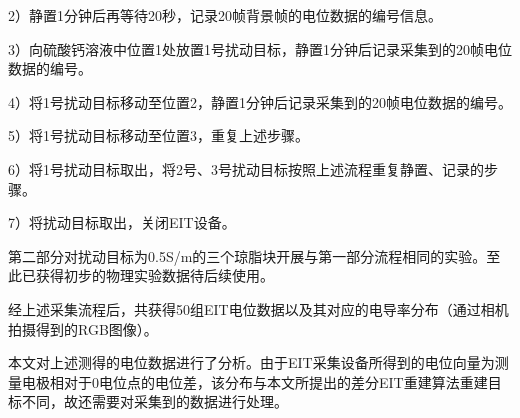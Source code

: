      2）静置1分钟后再等待20秒，记录20帧背景帧的电位数据的编号信息。

     3）向硫酸钙溶液中位置1处放置1号扰动目标，静置1分钟后记录采集到的20帧电位数据的编号。

     4）将1号扰动目标移动至位置2，静置1分钟后记录采集到的20帧电位数据的编号。

     5）将1号扰动目标移动至位置3，重复上述步骤。

     6）将1号扰动目标取出，将2号、3号扰动目标按照上述流程重复静置、记录的步骤。

     7）将扰动目标取出，关闭EIT设备。


第二部分对扰动目标为0.5S/m的三个琼脂块开展与第一部分流程相同的实验。至此已获得初步的物理实验数据待后续使用。

经上述采集流程后，共获得50组EIT电位数据以及其对应的电导率分布（通过相机拍摄得到的RGB图像）。

\label{geneD}
本文对上述测得的电位数据进行了分析。由于EIT采集设备所得到的电位向量为测量电极相对于0电位点的电位差，该分布与本文所提出的差分EIT重建算法重建目标不同，故还需要对采集到的数据进行处理。

